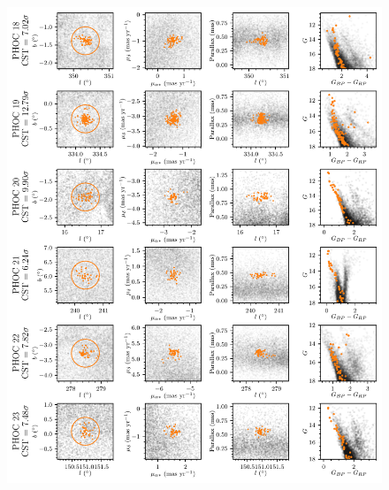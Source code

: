 \begin{figure}[ht]
   \centering
   \includegraphics[width=\textwidth]{fig/c2/fig_new_ocs_3.pdf}
   \caption[Plots of the new OCs PHOC 18 to 23]{}%
   \label{app:c2:fig:new_ocs_3}
\end{figure}

